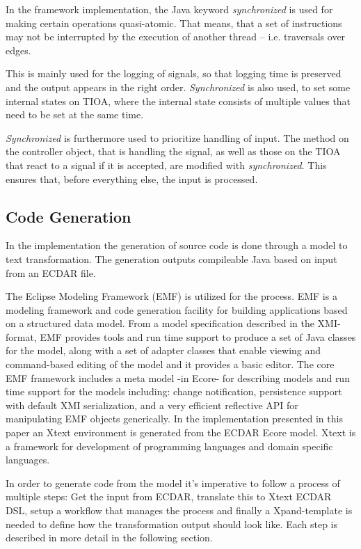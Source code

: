 In the framework implementation, the Java keyword \textit{synchronized} is 
used for making certain operations quasi-atomic. That means, that a set of
instructions may not be interrupted by the execution of another thread -- 
i.e. traversals over edges.

This is mainly used for the logging of signals, so that logging time
is preserved and the output appears in the right order. \textit{Synchronized}
is also used, to set some internal states on TIOA, where the internal state
consists of multiple values that need to be set at the same time.

\textit{Synchronized} is furthermore used to prioritize handling of input.  The
method on the controller object, that is handling the signal, as well as those
on the TIOA that react to a signal if it is accepted, are modified with
\textit{synchronized}. This ensures that, before everything else, the input is
processed.


\subsection{Code Generation}
\label{implementation-code-generation}

In the implementation the generation of source code is done
through a model to text transformation. The generation outputs compileable
Java based on input from an ECDAR file.

The Eclipse Modeling Framework (EMF) is utilized for the process. EMF is a
modeling framework and code generation facility for building applications based
on a structured data model. From a model specification described in the XMI-format, EMF
provides tools and run time support to produce a set of Java classes for the
model, along with a set of adapter classes that enable viewing and command-based
editing of the model and it provides a basic editor. The core EMF framework
includes a meta model -in Ecore- for describing models and run time support for the
models including: change notification, persistence support with default XMI
serialization, and a very efficient reflective API for manipulating EMF objects
generically. In the implementation presented in this paper an Xtext environment
is generated from the ECDAR Ecore model. Xtext is a framework for development of
programming languages and domain specific languages.

In order to generate code from the model it's imperative to follow a process of
multiple steps: Get the input from ECDAR, translate this to Xtext ECDAR DSL,
setup a workflow that manages the process and finally a Xpand-template is needed
to define how the transformation output should look like. Each step is described in more detail in the following section.

